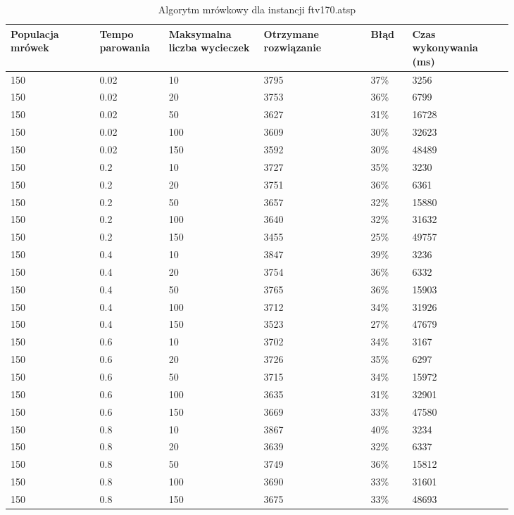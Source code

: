 \documentclass[12pt,a4paper,titlepage]{article}
\begin{document}
\begin{table}[H]
	\caption{Algorytm mrówkowy dla instancji ftv170.atsp}
    \centering
	\begin{tabular}{|p{0.15\linewidth}|p{0.10\linewidth}|p{0.16\linewidth}|p{0.18\linewidth}|p{0.07\linewidth}|p{0.17\linewidth}|}
		\hline
        Populacja mrówek & Tempo parowania & Maksymalna liczba \newline wycieczek & Otrzymane rozwiązanie & Błąd & Czas \newline wykonywania (ms) \\
		\hline
        150 & 0.02 & 10 & 3795 & 37\% & 3256 \\
        150 & 0.02 & 20 & 3753 & 36\% & 6799 \\
        150 & 0.02 & 50 & 3627 & 31\% & 16728 \\
        150 & 0.02 & 100 & 3609 & 30\% & 32623 \\
        150 & 0.02 & 150 & 3592 & 30\% & 48489 \\
        \hline
        150 & 0.2 & 10 & 3727 & 35\% & 3230 \\
        150 & 0.2 & 20 & 3751 & 36\% & 6361 \\
        150 & 0.2 & 50 & 3657 & 32\% & 15880 \\
        150 & 0.2 & 100 & 3640 & 32\% & 31632 \\
        150 & 0.2 & 150 & 3455 & 25\% & 49757 \\
        \hline
        150 & 0.4 & 10 & 3847 & 39\% & 3236 \\
        150 & 0.4 & 20 & 3754 & 36\% & 6332 \\
        150 & 0.4 & 50 & 3765 & 36\% & 15903 \\
        150 & 0.4 & 100 & 3712 & 34\% & 31926 \\
        150 & 0.4 & 150 & 3523 & 27\% & 47679 \\
        \hline
        150 & 0.6 & 10 & 3702 & 34\% & 3167 \\
        150 & 0.6 & 20 & 3726 & 35\% & 6297 \\
        150 & 0.6 & 50 & 3715 & 34\% & 15972 \\
        150 & 0.6 & 100 & 3635 & 31\% & 32901 \\
        150 & 0.6 & 150 & 3669 & 33\% & 47580 \\
        \hline
        150 & 0.8 & 10 & 3867 & 40\% & 3234 \\
        150 & 0.8 & 20 & 3639 & 32\% & 6337 \\
        150 & 0.8 & 50 & 3749 & 36\% & 15812 \\
        150 & 0.8 & 100 & 3690 & 33\% & 31601 \\
        150 & 0.8 & 150 & 3675 & 33\% & 48693 \\
        \hline
    \end{tabular}
\end{table}
\end{document}
